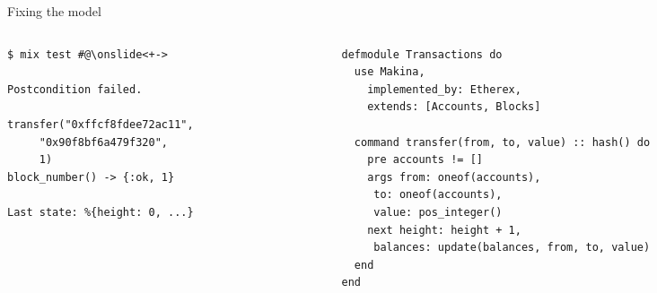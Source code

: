 \documentclass[aspectratio=169, 10pt, handout]{beamer}
\begin{document}
\begin{frame}[label={sec:orga87c4c1},fragile]{Fixing the model}
 \begin{columns}
\begin{column}{0.44\columnwidth}
\lstset{language=bash,label= ,caption= ,captionpos=b,numbers=none,style=shell}
\begin{lstlisting}
$ mix test #@\onslide<+->

Postcondition failed.

transfer("0xffcf8fdee72ac11",
	 "0x90f8bf6a479f320",
	 1)
block_number() -> {:ok, 1}

Last state: %{height: 0, ...}
\end{lstlisting}
\end{column}

\begin{column}{0.52\columnwidth}
\onslide<+->
\lstset{language=elixir,label= ,caption= ,captionpos=b,numbers=none,style=display}
\begin{lstlisting}
defmodule Transactions do
  use Makina,
    implemented_by: Etherex,
    extends: [Accounts, Blocks]

  command transfer(from, to, value) :: hash() do
    pre accounts != []
    args from: oneof(accounts),
	 to: oneof(accounts),
	 value: pos_integer()
    next height: height + 1,
	 balances: update(balances, from, to, value)
  end
end
\end{lstlisting}
\end{column}
\end{columns}
\end{frame}
\end{document}
